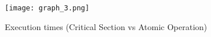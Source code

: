 \documentclass[acmtog]{acmart}
\begin{document}
\begin{figure}[h]
    \centering
    \texttt{[image: graph\_3.png]}
    \caption{Execution times (Critical Section vs Atomic Operation)}
    \label{fig:placeholder}
\end{figure}









\end{document}
